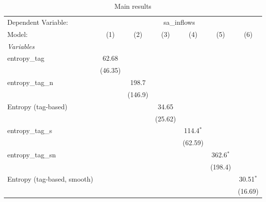 
\begin{table}[htbp]
   \centering
   \caption{\label{tab:reg_sa_inflows_tag.tex} Main results}
   \begin{footnotesize}
      \begin{tabular}{lcccccc}
         \tabularnewline\midrule\midrule
         Dependent Variable: & \multicolumn{6}{c}{sa\_inflows}\\
         Model:                      & (1)            & (2)            & (3)            & (4)            & (5)            & (6)\\
         \midrule \emph{Variables} &   &   &   &   &   &  \\
         entropy\_tag               & 62.68          &                &                &                &                &   \\
                                     & (46.35)        &                &                &                &                &   \\
         entropy\_tag\_n           &                & 198.7          &                &                &                &   \\
                                     &                & (146.9)        &                &                &                &   \\
         Entropy (tag-based)         &                &                & 34.65          &                &                &   \\
                                     &                &                & (25.62)        &                &                &   \\
         entropy\_tag\_s           &                &                &                & 114.4$^{*}$    &                &   \\
                                     &                &                &                & (62.59)        &                &   \\
         entropy\_tag\_sn          &                &                &                &                & 362.6$^{*}$    &   \\
                                     &                &                &                &                & (198.4)        &   \\
         Entropy (tag-based, smooth) &                &                &                &                &                & 30.51$^{*}$\\
                                     &                &                &                &                &                & (16.69)\\

\end{tabular}
\end{footnotesize}
\end{table}
